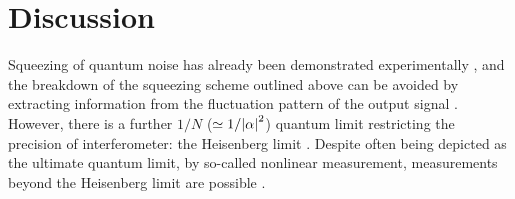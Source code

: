 \documentclass[hyperref, a4paper]{article}
\begin{document}
\section{Discussion}

Squeezing of quantum noise has already been demonstrated experimentally \cite{xiao_precision_1987},
and the breakdown of the squeezing scheme outlined above 
can be avoided by extracting information from the fluctuation pattern of the output signal 
\cite{pezze_mach-zehnder_2008}. 
However, there is a further $1 / N$ ($\simeq 1 / \abs{\alpha}^2$) 
quantum limit restricting the precision of interferometer:
the Heisenberg limit \cite{giovannetti_quantum_2006}.
Despite often being depicted as the ultimate quantum limit,
by so-called nonlinear measurement, measurements beyond the Heisenberg limit are possible 
\cite{napolitano_interaction-based_2011}.

\printbibliography
\end{document}
